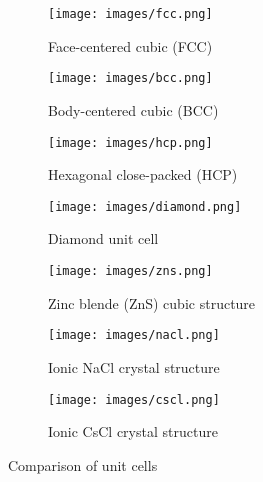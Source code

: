 \begin{figure}[ht!]
    \centering
    \begin{subfigure}[t]{0.32\linewidth}
        \centering
        \texttt{[image: images/fcc.png]}
        \caption{Face-centered cubic (FCC)}
    \end{subfigure}
    \begin{subfigure}[t]{0.32\linewidth}
        \centering
        \texttt{[image: images/bcc.png]}
        \caption{Body-centered cubic (BCC)}
    \end{subfigure}
    \begin{subfigure}[t]{0.32\linewidth}
        \centering
        \texttt{[image: images/hcp.png]}
        \caption{Hexagonal close-packed (HCP)}
    \end{subfigure} 
    
    \begin{subfigure}[t]{0.24\linewidth}
        \centering
        \texttt{[image: images/diamond.png]}
        \caption{Diamond unit cell}
    \end{subfigure}
    \begin{subfigure}[t]{0.24\linewidth}
        \centering
        \texttt{[image: images/zns.png]}
        \caption{Zinc blende (ZnS) cubic structure}
    \end{subfigure} 
    \begin{subfigure}[t]{0.24\linewidth}
        \centering
        \texttt{[image: images/nacl.png]}
        \caption{Ionic NaCl crystal structure}
    \end{subfigure}  
    \begin{subfigure}[t]{0.24\linewidth}
        \centering
        \texttt{[image: images/cscl.png]}
        \caption{Ionic CsCl crystal structure}
    \end{subfigure}     
    \caption{Comparison of unit cells}
\end{figure}

